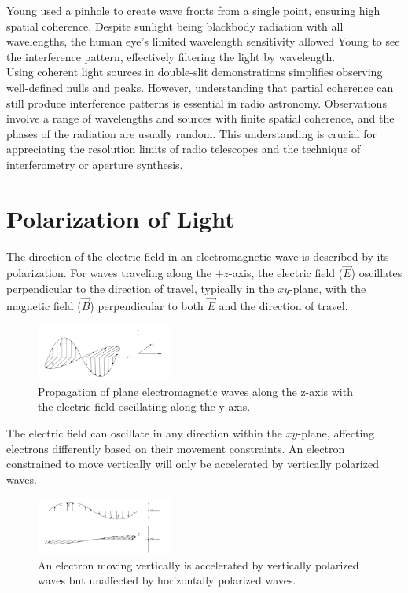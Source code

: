 Young used a pinhole to create wave fronts from a single point, ensuring high spatial coherence. Despite sunlight being blackbody radiation with all wavelengths, the human eye's limited wavelength sensitivity allowed Young to see the interference pattern, effectively filtering the light by wavelength. \\

Using coherent light sources in double-slit demonstrations simplifies observing well-defined nulls and peaks. However, understanding that partial coherence can still produce interference patterns is essential in radio astronomy. Observations involve a range of wavelengths and sources with finite spatial coherence, and the phases of the radiation are usually random. This understanding is crucial for appreciating the resolution limits of radio telescopes and the technique of interferometry or aperture synthesis.

\clearpage

\section{Polarization of Light}

The direction of the electric field in an electromagnetic wave is described by its polarization. For waves traveling along the \(+z\)-axis, the electric field (\(\vec{E}\)) oscillates perpendicular to the direction of travel, typically in the \(xy\)-plane, with the magnetic field (\(\vec{B}\)) perpendicular to both \(\vec{E}\) and the direction of travel.

\begin{figure}[H]
    \centering
    \includegraphics[width=0.4\textwidth]{Images/polarization_wave.png}
    \caption{Propagation of plane electromagnetic waves along the z-axis with the electric field oscillating along the y-axis.}
    \label{fig:polarization_wave}
\end{figure}

The electric field can oscillate in any direction within the \(xy\)-plane, affecting electrons differently based on their movement constraints. An electron constrained to move vertically will only be accelerated by vertically polarized waves.

\begin{figure}[H]
    \centering
    \includegraphics[width=0.4\textwidth]{Images/polarization_electron.png}
    \caption{An electron moving vertically is accelerated by vertically polarized waves but unaffected by horizontally polarized waves.}
    \label{fig:polarization_electron}
\end{figure}

